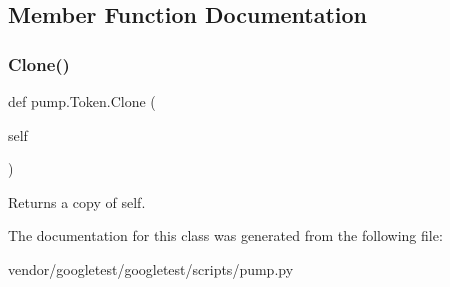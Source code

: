 \subsection{Member Function Documentation}
\mbox{\label{classpump_1_1_token_abc0f2d2a0bcad953f5fc85a4e52076eb}} 
\subsubsection{\texorpdfstring{Clone()}{Clone()}}
{\footnotesize\ttfamily def pump.\+Token.\+Clone (\begin{DoxyParamCaption}\item[{}]{self }\end{DoxyParamCaption})}

\begin{DoxyVerb}Returns a copy of self.\end{DoxyVerb}
 

The documentation for this class was generated from the following file\+:\begin{DoxyCompactItemize}
\item 
vendor/googletest/googletest/scripts/pump.\+py\end{DoxyCompactItemize}

